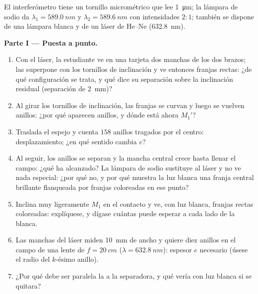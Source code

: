 \begin{problem}
\label{pb:b2:michelson:1}

El interferómetro tiene un tornillo micrométrico que lee \qty{1}{\micro m}; la
lámpara de sodio da $\lambda_1 = \qty{589.0}{nm}$ y $\lambda_2 = \qty{589.6}{nm}$ con
intensidades $2 : 1$; también se dispone de una lámpara blanca y de un láser de He--Ne (\qty{632.8}{nm}).

\medskip
\noindent\textbf{Parte I --- Puesta a punto.}
\begin{enumerate}
  \item Con el láser, la estudiante ve en una tarjeta dos manchas de los dos brazos;
        las superpone con los tornillos de inclinación y ve entonces
        franjas rectas: ¿de qué configuración se trata, y qué dice
        su separación sobre la inclinación residual (separación de \qty{2}{mm})?
  \item Al girar los tornillos de inclinación, las franjas se curvan y luego se vuelven
        anillos: ¿por qué aparecen anillos, y dónde está ahora $M_1'$?
  \item Traslada el espejo y cuenta $158$ anillos tragados por
        el centro: desplazamiento; ¿en qué sentido cambia $e$?
  \item Al seguir, los anillos se separan y la mancha central crece
        hasta llenar el campo: ¿qué ha alcanzado? La lámpara de sodio
        sustituye al láser y no ve nada especial: ¿por qué no, y
        por qué muestra la luz blanca una franja central brillante flanqueada por
        franjas coloreadas en ese punto?
  \item Inclina muy ligeramente $M_1$ en el contacto y ve, con luz
        blanca, franjas rectas coloreadas: explíquese, y dígase cuántas
        puede esperar a cada lado de la blanca.
  \item Las manchas del láser miden \qty{10}{mm} de ancho y quiere diez anillos
        en el campo de una lente de $f = \qty{20}{cm}$ ($\lambda = \qty{632.8}{nm}$):
        espesor $e$ necesario (úsese el radio del $k$-ésimo anillo).
  \item ¿Por qué debe ser paralela la  a la separadora,
        y qué vería con luz blanca si se quitara?
\end{enumerate}


\end{problem}
